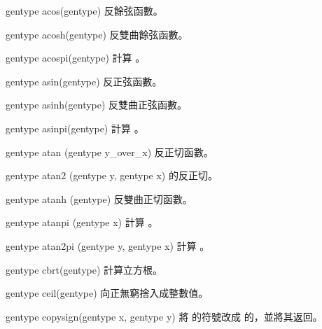 gentype acos(gentype)
\stopbuffer
{}
反餘弦函數。
\stopbuffer

gentype acosh(gentype)
\stopbuffer
{}
反雙曲餘弦函數。
\stopbuffer

gentype acospi(gentype)
\stopbuffer
{}
計算 。
\stopbuffer

gentype asin(gentype)
\stopbuffer
{}
反正弦函數。
\stopbuffer

gentype asinh(gentype)
\stopbuffer
{}
反雙曲正弦函數。
\stopbuffer

gentype asinpi(gentype)
\stopbuffer
{}
計算 。
\stopbuffer

gentype atan (gentype y_over_x)
\stopbuffer
{}
反正切函數。
\stopbuffer

gentype atan2 (gentype y,
		gentype x)
\stopbuffer
{}
 的反正切。
\stopbuffer

gentype atanh (gentype)
\stopbuffer
{}
反雙曲正切函數。
\stopbuffer

gentype atanpi (gentype x)
\stopbuffer
{}
計算 。
\stopbuffer

gentype atan2pi (gentype y,
		gentype x)
\stopbuffer
{}
計算 。
\stopbuffer

gentype cbrt(gentype)
\stopbuffer
{}
計算立方根。
\stopbuffer

gentype ceil(gentype)
\stopbuffer
{}
向正無窮捨入成整數值。
\stopbuffer

gentype copysign(gentype x,
		 gentype y)
\stopbuffer
{}
將  的符號改成  的，並將其返回。
\stopbuffer


